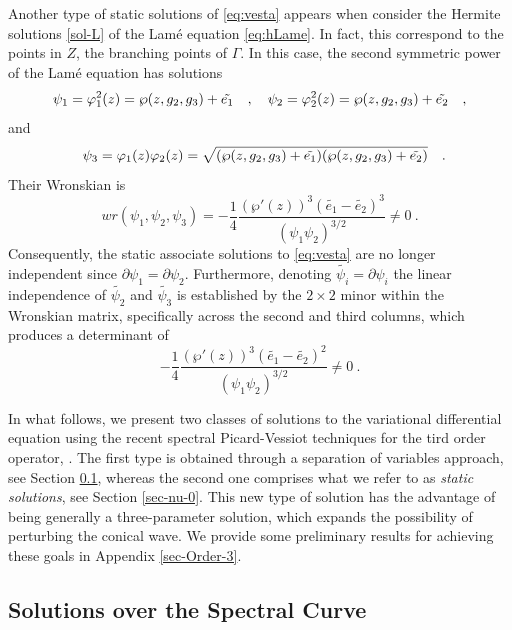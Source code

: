 \documentclass[a4paper,12pt]{article}
\begin{document}
Another type of static solutions of \eqref{eq:vesta} appears when consider the Hermite solutions  \eqref{sol-L} of the Lam\'e equation \eqref{eq:hLame}. In fact, this correspond to the points in $Z$, the branching  points of $\Gamma$. In this case, the second symmetric power of the Lam\'e equation has solutions
\begin{equation}
    \psi_1= \varphi_1^2 (z)  = \wp(z, g_2 , g_3 ) +\Tilde{e_1 } \quad ,  \quad           \psi_2= \varphi_2^2 (z)   =\wp(z, g_2 , g_3 ) +\Tilde{e_2 } \quad ,  
\end{equation}
and 
\[
\quad    
     \psi_3= \varphi_1 (z)  \varphi_2 (z) =\sqrt{(\wp(z, g_2 , g_3 ) +\Tilde{e_1 } )( \wp(z, g_2 , g_3 ) +\Tilde{e_2 }) }
     \quad .  \ 
\]
Their Wronskian is
\[
wr (\psi_1 , \psi_2 , \psi_3 ) = -\frac14 \frac{(\wp'(z) )^3 ( \tilde{e_1}-\tilde{e_2 } )^3}{(\psi_1 \psi_2 )^{3/2}}\not=0 \ .
\]
Consequently, the static associate solutions to \eqref{eq:vesta} are no longer independent since $ \partial \psi_1 = \partial \psi_2$. Furthermore, denoting $\widetilde{\psi_i } = \partial \psi_i$  the linear independence of \(\tilde{\psi _{2}}\) and \(\tilde{\psi _{3}}\) is established by the \(2 \times 2\) minor within the Wronskian matrix, specifically across the second and third columns, which produces a determinant of
\[
-\frac14 \frac{(\wp'(z) )^3 ( \tilde{e_1}-\tilde{e_2 } )^2}{(\psi_1 \psi_2 )^{3/2}}\not=0 \ .
\]
\bigskip


In what follows, we present two classes of solutions to the variational differential equation using the recent spectral Picard-Vessiot techniques for the tird order operator, \cite{RZ2024}. The first type is obtained through a separation of variables approach, see Section \ref{sec-nu}, whereas the second one comprises what we refer to as {\it static solutions}, see Section \ref{sec-nu-0}. This new type of solution has the advantage of being generally a three-parameter solution, which expands the possibility of perturbing the conical wave. We provide some preliminary results for achieving these goals in Appendix \ref{sec-Order-3}.






\subsection{Solutions over the Spectral Curve}\label{sec-nu}
\end{document}

